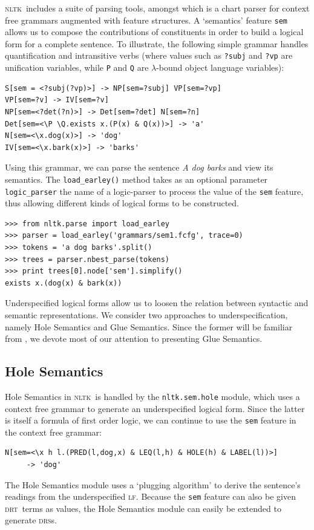 \documentclass[11pt, a4paper]{article}
\newcommand{\DRS}{\textsc{drs}}
\newcommand{\DRT}{\textsc{drt}}
\newcommand{\NLTK}{\textsc{nltk}}
\newcommand{\LF}{\textsc{lf}}
\newcommand{\dhgcode}[1]{{\tt #1}}
\begin{document}
\NLTK\ includes a suite of parsing tools, amongst which is a chart
parser for context free grammars augmented with feature structures. A
`semantics' feature \texttt{sem} allows us to compose the
contributions of constituents in order to build a logical form for a
complete sentence.  To illustrate, the following simple grammar
handles quantification and intransitive verbs (where values such as
\texttt{?subj} and \texttt{?vp} are unification variables, while
\texttt{P} and \texttt{Q} are $\lambda$-bound object language
variables):

\begin{Verbatim}
S[sem = <?subj(?vp)>] -> NP[sem=?subj] VP[sem=?vp]
VP[sem=?v] -> IV[sem=?v]
NP[sem=<?det(?n)>] -> Det[sem=?det] N[sem=?n]
Det[sem=<\P \Q.exists x.(P(x) & Q(x))>] -> 'a'
N[sem=<\x.dog(x)>] -> 'dog'
IV[sem=<\x.bark(x)>] -> 'barks'
\end{Verbatim}
Using this grammar, we can parse the sentence \textit{A dog barks} and view
its semantics. 
The \dhgcode{load\_earley()} method
takes as an optional parameter \dhgcode{logic\_parser} the name of a
logic-parser to process the value of the \texttt{sem} feature, thus
allowing different kinds of logical forms to be constructed.
\begin{Verbatim}
>>> from nltk.parse import load_earley
>>> parser = load_earley('grammars/sem1.fcfg', trace=0)
>>> tokens = 'a dog barks'.split()
>>> trees = parser.nbest_parse(tokens)
>>> print trees[0].node['sem'].simplify()
exists x.(dog(x) & bark(x))
\end{Verbatim}

Underspecified logical forms allow us to loosen the relation between
syntactic and semantic representations. We consider two approaches to
underspecification, namely Hole
Semantics and Glue Semantics. Since the former will be familiar from 
\citep{BB}, we devote most of our attention to presenting Glue
Semantics.

\subsection{Hole Semantics}

Hole Semantics in \NLTK\ is handled by the
\dhgcode{nltk.sem.hole} module, which uses a context free grammar to
generate an underspecified logical form.  Since the latter is itself a
formula of first order logic, we can continue to use the \texttt{sem} feature
in the context free grammar:
\begin{Verbatim}[frame=none]
N[sem=<\x h l.(PRED(l,dog,x) & LEQ(l,h) & HOLE(h) & LABEL(l))>] 
     -> 'dog'
\end{Verbatim}
The Hole Semantics module uses a `plugging algorithm' to derive the
sentence's readings from the underspecified \LF.  Because the \texttt{sem}
feature can also be given \DRT\ terms as values, the Hole Semantics module can
easily be extended to generate \DRS s.
\end{document}
